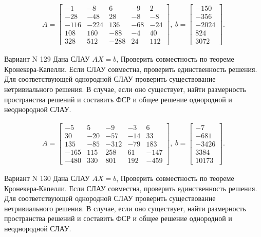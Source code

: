 \documentclass[11pt]{report}
\begin{document}
\begin{align*}
 A = \left[\begin{matrix}-1 & -8 & 6 & -9 & 2\\-28 & -48 & 28 & -8 & -8\\-116 & -224 & 136 & -68 & -24\\108 & 160 & -88 & -4 & 40\\328 & 512 & -288 & 24 & 112\end{matrix}\right],
\ b = \left[\begin{matrix}-150\\-356\\-2024\\824\\3072\end{matrix}\right]. 
 \end{align*}

Вариант N 129
Дана СЛАУ $AX = b$,
Проверить совместность по теореме Кронекера-Капелли. Если СЛАУ совместна, проверить единственность решения.
Для соответствующей однородной СЛАУ проверить существование нетривиального решения. В случае, если оно существует,
найти размерность пространства решений и составить ФСР и общее решение однородной  и неоднородной СЛАУ.


\begin{align*}
 A = \left[\begin{matrix}-5 & 5 & -9 & -3 & 6\\30 & -20 & -57 & -14 & 33\\135 & -85 & -312 & -79 & 183\\-165 & 115 & 258 & 61 & -147\\-480 & 330 & 801 & 192 & -459\end{matrix}\right],
\ b = \left[\begin{matrix}-7\\-681\\-3426\\3384\\10173\end{matrix}\right]. 
 \end{align*}

Вариант N 130
Дана СЛАУ $AX = b$,
Проверить совместность по теореме Кронекера-Капелли. Если СЛАУ совместна, проверить единственность решения.
Для соответствующей однородной СЛАУ проверить существование нетривиального решения. В случае, если оно существует,
найти размерность пространства решений и составить ФСР и общее решение однородной  и неоднородной СЛАУ.
\end{document}
